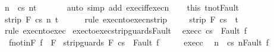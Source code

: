 \begin{isabellebody}
\ n\ \ {\isachardoublequoteopen}{\isasymGamma}{\isasymturnstile}{\isasymlangle}c{\isacharcomma}s{\isasymrangle}\ {\isacharequal}n{\isasymRightarrow}t{\isachardoublequoteclose}\ \isanewline
\ \ \ \ \isamarkupfalse%
\ {\isacharparenleft}auto\ simp\ add{\isacharcolon}\ exec{\isacharunderscore}iff{\isacharunderscore}execn{\isacharparenright}\isanewline
\ \ \isamarkupfalse%
\ this\ t{\isacharunderscore}not{\isacharunderscore}Fault\isanewline
\ \ \isamarkupfalse%
\ {\isachardoublequoteopen}strip\ F\ {\isasymGamma}{\isasymturnstile}{\isasymlangle}c{\isacharcomma}s{\isasymrangle}\ {\isacharequal}n{\isasymRightarrow}\ t{\isachardoublequoteclose}\isanewline
\ \ \ \ \isamarkupfalse%
\ {\isacharparenleft}rule\ execn{\isacharunderscore}to{\isacharunderscore}execn{\isacharunderscore}strip{\isacharprime}\ {\isacharparenright}\isanewline
\ \ \isamarkupfalse%
\ {\isachardoublequoteopen}strip\ F\ {\isasymGamma}{\isasymturnstile}{\isasymlangle}c{\isacharcomma}s{\isasymrangle}\ {\isasymRightarrow}\ t{\isachardoublequoteclose}\isanewline
\ \ \ \ \isamarkupfalse%
\ {\isacharparenleft}rule\ execn{\isacharunderscore}to{\isacharunderscore}exec{\isacharparenright}\isanewline
{}\isamarkupfalse%
%
\endisatagproof
{\isafoldproof}%
%
\isadelimproof
\isanewline
%
\endisadelimproof
\isanewline
{}\isamarkupfalse%
\ exec{\isacharunderscore}to{\isacharunderscore}exec{\isacharunderscore}strip{\isacharunderscore}guards{\isacharunderscore}Fault{\isacharcolon}\isanewline
\ \ exec{\isacharunderscore}c{\isacharcolon}\ {\isachardoublequoteopen}{\isasymGamma}{\isasymturnstile}{\isasymlangle}c{\isacharcomma}s{\isasymrangle}\ {\isasymRightarrow}\ Fault\ f{\isachardoublequoteclose}\isanewline
\ \ f{\isacharunderscore}notin{\isacharunderscore}F{\isacharcolon}\ {\isachardoublequoteopen}f\ {\isasymnotin}\ F{\isachardoublequoteclose}\isanewline
\ strip{\isacharunderscore}guards\ F\ c{\isacharcomma}s{\isasymrangle}\ {\isasymRightarrow}\ Fault\ f{\isachardoublequoteclose}\isanewline
%
\isadelimproof
%
\endisadelimproof
%
\isatagproof
{}\isamarkupfalse%
\ {\isacharminus}\isanewline
\ \ \isamarkupfalse%
\ exec{\isacharunderscore}c\ \isamarkupfalse%
\ n\ \ {\isachardoublequoteopen}{\isasymGamma}{\isasymturnstile}{\isasymlangle}c{\isacharcomma}s{\isasymrangle}\ {\isacharequal}n{\isasymRightarrow}Fault\ f{\isachardoublequoteclose}\ \isanewline

\end{isabellebody}
